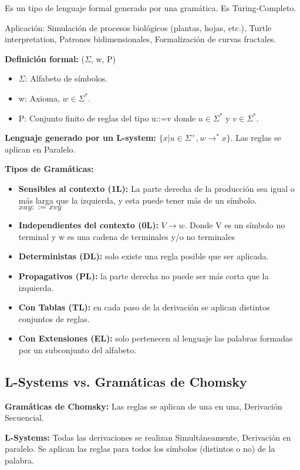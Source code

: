 Es un tipo de lenguaje formal generado por una gramática. Es Turing-Completo.

Aplicación: Simulación de procesos biológicos (plantas, hojas, etc.), Turtle interpretation, Patrones bidimensionales, Formalización de curvas fractales.

\textbf{Definición formal:} ($\Sigma$, w, P)
\begin{itemize}
	\item $\Sigma$: Alfabeto de símbolos.
	\item w: Axioma, $w \in \Sigma^*$.
	\item P: Conjunto finito de reglas del tipo u::=v donde $u \in \Sigma^*$ y $v \in \Sigma^*$.
\end{itemize}

\textbf{Lenguaje generado por un L-system:} $\{x | u \in \Sigma^+, w \rightarrow^* x\}$. Las reglas se aplican en Paralelo.

\textbf{Tipos de Gramáticas:}
\begin{itemize}
	\item \textbf{Sensibles al contexto (1L):} La parte derecha de la producción sea igual o más larga que la izquierda, y esta puede tener más de un símbolo. $xay::=xvy$
	\item \textbf{Independientes del contexto (0L):} $V \rightarrow w$. Donde V es un símbolo no terminal y w es una cadena de terminales y/o no terminales
	\item \textbf{Deterministas (DL):} solo existe una regla posible que ser aplicada.
	\item \textbf{Propagativos (PL):} la parte derecha no puede ser más corta que la izquierda.
	\item \textbf{Con Tablas (TL):} en cada paso de la derivación se aplican distintos conjuntos de reglas.
	\item \textbf{Con Extensiones (EL):} solo pertenecen al lenguaje las palabras formadas por un subconjunto del alfabeto.
\end{itemize}

\subsection{L-Systems vs. Gramáticas de Chomsky}
\textbf{Gramáticas de Chomsky:} Las reglas se aplican de una en una, Derivación Secuencial.

\textbf{L-Systems:} Todas las derivaciones se realizan Simultáneamente, Derivación en paralelo. Se aplican las reglas para todos los símbolos (distintos o no) de la palabra.

